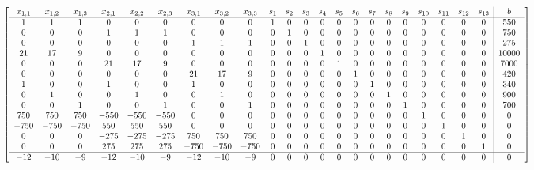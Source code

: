 \documentclass{article}
\begin{document}
\begin{equation*}
\scalebox{0.78}{$ %
\begin{bmatrix}
\begin{array}{cccccccccccccccccccccc|c}
x_{1,1} & x_{1,2} & x_{1,3} & x_{2,1} & x_{2,2} & x_{2,3} & x_{3,1} & x_{3,2} & x_{3,3} & s_1 & s_2 & s_3 & s_4 & s_5 & s_6 & s_7 & s_8 & s_9 & s_{10} & s_{11} & s_{12} & s_{13} & b \\ 
\hline
1 & 1 & 1 & 0 & 0 & 0 & 0 & 0 & 0 & 1 & 0 & 0 & 0 & 0 & 0 & 0 & 0 & 0 & 0 & 0 & 0 & 0 & 550 \\
0 & 0 & 0 & 1 & 1 & 1 & 0 & 0 & 0 & 0 & 1 & 0 & 0 & 0 & 0 & 0 & 0 & 0 & 0 & 0 & 0 & 0 & 750 \\
0 & 0 & 0 & 0 & 0 & 0 & 1 & 1 & 1 & 0 & 0 & 1 & 0 & 0 & 0 & 0 & 0 & 0 & 0 & 0 & 0 & 0 & 275 \\
21 & 17 & 9 & 0 & 0 & 0 & 0 & 0 & 0 & 0 & 0 & 0 & 1 & 0 & 0 & 0 & 0 & 0 & 0 & 0 & 0 & 0 & 10000 \\
0 & 0 & 0 & 21 & 17 & 9 & 0 & 0 & 0 & 0 & 0 & 0 & 0 & 1 & 0 & 0 & 0 & 0 & 0 & 0 & 0 & 0 & 7000 \\
0 & 0 & 0 & 0 & 0 & 0 & 21 & 17 & 9 & 0 & 0 & 0 & 0 & 0 & 1 & 0 & 0 & 0 & 0 & 0 & 0 & 0 & 420 \\
1 & 0 & 0 & 1 & 0 & 0 & 1 & 0 & 0 & 0 & 0 & 0 & 0 & 0 & 0 & 1 & 0 & 0 & 0 & 0 & 0 & 0 & 340 \\
0 & 1 & 0 & 0 & 1 & 0 & 0 & 1 & 0 & 0 & 0 & 0 & 0 & 0 & 0 & 0 & 1 & 0 & 0 & 0 & 0 & 0 & 900 \\
0 & 0 & 1 & 0 & 0 & 1 & 0 & 0 & 1 & 0 & 0 & 0 & 0 & 0 & 0 & 0 & 0 & 1 & 0 & 0 & 0 & 0 & 700 \\
750 & 750 & 750 & -550 & -550 & -550 & 0 & 0 & 0 & 0 & 0 & 0 & 0 & 0 & 0 & 0 & 0 & 0 & 1 & 0 & 0 & 0 & 0 \\
-750 & -750 & -750 & 550 & 550 & 550 & 0 & 0 & 0 & 0 & 0 & 0 & 0 & 0 & 0 & 0 & 0 & 0 & 0 & 1 & 0 & 0 & 0 \\
0 & 0 & 0 & -275 & -275 & -275 & 750 & 750 & 750 & 0 & 0 & 0 & 0 & 0 & 0 & 0 & 0 & 0 & 0 & 0 & 1 & 0 & 0 \\
0 & 0 & 0 & 275 & 275 & 275 & -750 & -750 & -750 & 0 & 0 & 0 & 0 & 0 & 0 & 0 & 0 & 0 & 0 & 0 & 0 & 1 & 0 \\
\hline
-12 & -10 & -9 & -12 & -10 & -9 & -12 & -10 & -9 & 0 & 0 & 0 & 0 & 0 & 0 & 0 & 0 & 0 & 0 & 0 & 0 & 0 & 0 \\
\end{array}
\end{bmatrix}
\begin{array}{c}
\\
\end{array}
$}
\end{equation*}
\end{document}
